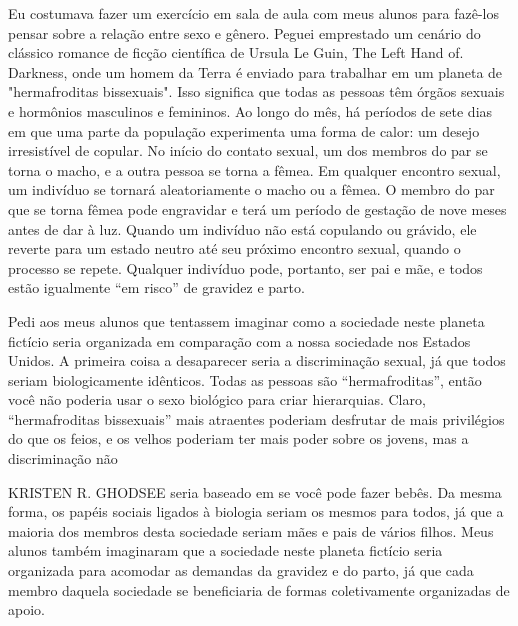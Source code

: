Eu costumava fazer um exercício em sala de aula com meus alunos para fazê-los pensar sobre a relação entre sexo e gênero. Peguei emprestado um cenário do clássico romance de ficção científica de Ursula Le Guin, The Left Hand of. Darkness, onde um homem da Terra é enviado para trabalhar em um planeta de "hermafroditas bissexuais". Isso significa que todas as pessoas têm órgãos sexuais e hormônios masculinos e femininos. Ao longo do mês, há períodos de sete dias em que uma parte da população experimenta uma forma de calor: um desejo irresistível de copular. No início do contato sexual, um dos membros do par se torna o macho, e a outra pessoa se torna a fêmea. Em qualquer encontro sexual, um indivíduo se tornará aleatoriamente o macho ou a fêmea. O membro do par que se torna fêmea pode engravidar e terá um período de gestação de nove meses antes de dar à luz. Quando um indivíduo não está copulando ou grávido, ele reverte para um estado neutro até seu próximo encontro sexual, quando o processo se repete. Qualquer indivíduo pode, portanto, ser pai e mãe, e todos estão igualmente “em risco” de gravidez e parto.
 \par 
Pedi aos meus alunos que tentassem imaginar como a sociedade neste planeta fictício seria organizada em comparação com a nossa sociedade nos Estados Unidos. A primeira coisa a desaparecer seria a discriminação sexual, já que todos seriam biologicamente idênticos. Todas as pessoas são “hermafroditas”, então você não poderia usar o sexo biológico para criar hierarquias. Claro, “hermafroditas bissexuais” mais atraentes poderiam desfrutar de mais privilégios do que os feios, e os velhos poderiam ter mais poder sobre os jovens, mas a discriminação não
 \par 
KRISTEN R. GHODSEE seria baseado em se você pode fazer bebês. Da mesma forma, os papéis sociais ligados à biologia seriam os mesmos para todos, já que a maioria dos membros desta sociedade seriam mães e pais de vários filhos. Meus alunos também imaginaram que a sociedade neste planeta fictício seria organizada para acomodar as demandas da gravidez e do parto, já que cada membro daquela sociedade se beneficiaria de formas coletivamente organizadas de apoio.
 \par 
